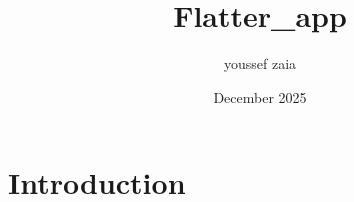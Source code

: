 \documentclass{article}
\title{Flatter_app}
\author{youssef zaia}
\date{December 2025}
\begin{document}
\maketitle

\section{Introduction}
\end{document}
